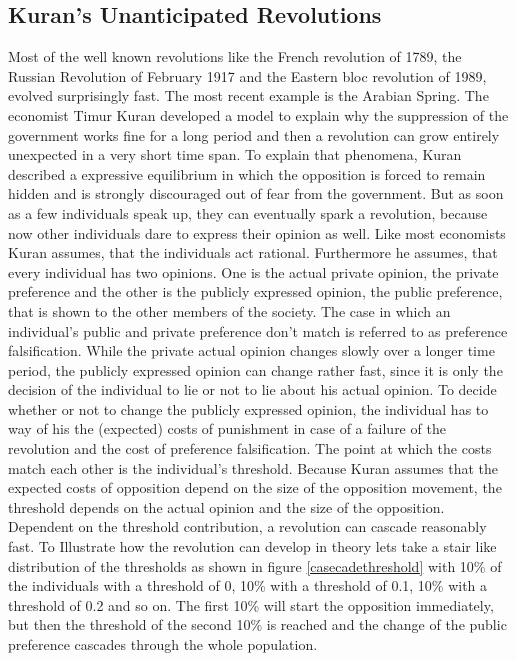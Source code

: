 

\subsection{Kuran's Unanticipated Revolutions} \label{sec: Kuran}

Most of the well known revolutions like the French revolution of 1789, the Russian Revolution of February 1917 and the Eastern bloc revolution of 1989, evolved surprisingly fast. The most recent example is the Arabian Spring. The economist Timur Kuran developed a model to explain why the suppression of the government works fine for a long period and then a revolution can grow entirely unexpected in a very short time span. \cite{Kuran_1989}
To explain that phenomena, Kuran described a expressive equilibrium in which the opposition is forced to remain hidden and is strongly discouraged out of fear from the government. But as soon as a few individuals speak up, they can eventually spark a revolution, because now other individuals dare to express their opinion as well.
Like most economists Kuran assumes, that the individuals act rational. Furthermore he assumes, that every individual has two opinions. One is the actual private opinion, the private preference and the other is the publicly expressed opinion, the public preference, that is shown to the other members of the society. The case in which an individual's public and private preference don't match is referred to as preference falsification. While the private actual opinion changes slowly over a longer time period, the publicly expressed opinion can change rather fast, since it is only the decision of the individual to lie or not to lie about his actual opinion. 
To decide whether or not to change the publicly expressed opinion, the individual has to way of his the (expected) costs of punishment in case of a failure of the revolution and the cost of preference falsification. The point at which the costs match each other is the individual's threshold.  Because Kuran assumes that the expected costs of opposition depend on the size of the opposition movement, the threshold depends on the actual opinion and the size of the opposition. Dependent on the threshold contribution, a revolution can cascade reasonably fast. \cite{Donnay_2011}
To Illustrate how the revolution can develop in theory lets take a stair like distribution of the thresholds as shown in figure \ref{casecadethreshold} with 10\% of the individuals with a threshold of 0, 10\% with a threshold of 0.1, 10\% with a threshold of 0.2 and so on. The first 10\% will start the opposition immediately, but then the threshold of the second 10\% is reached and the change of the public preference cascades through the whole population.
